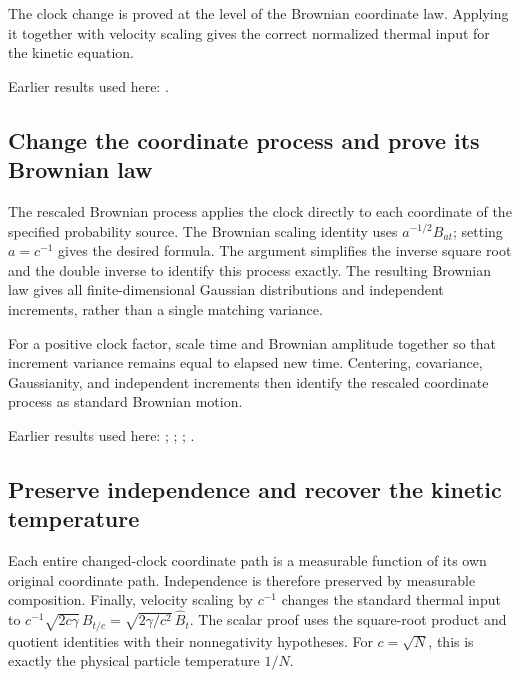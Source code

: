 \documentclass[11pt,a4paper]{report}
\begin{document}
The clock change is proved at the level of the Brownian coordinate law. Applying it together with velocity scaling gives the correct normalized thermal input for the kinetic equation.



Earlier results used here: \cite[Section~3.8]{LangevinLean2026ULASC}.
\subsection{\texorpdfstring{Change the coordinate process and prove its Brownian law}{Change the coordinate process and prove its Brownian law}}
\label{report-step-KineticLangevin-BrownianScaling-lean-1}


The rescaled Brownian process applies the clock directly to each coordinate of the specified probability source. The Brownian scaling identity uses \(a^{-1/2}B_{at}\); setting \(a=c^{-1}\) gives the desired formula. The argument simplifies the inverse square root and the double inverse to identify this process exactly. The resulting Brownian law gives all finite-dimensional Gaussian distributions and independent increments, rather than a single matching variance.



For a positive clock factor, scale time and Brownian amplitude together so that increment variance remains equal to elapsed new time. Centering, covariance, Gaussianity, and independent increments then identify the rescaled coordinate process as standard Brownian motion.



Earlier results used here: \cite[Section~3.8.16]{LangevinLean2026ULASC}; \cite[Section~3.8.17]{LangevinLean2026ULASC}; \cite[Section~3.8.18]{LangevinLean2026ULASC}; \cite[Section~3.8.19]{LangevinLean2026ULASC}.
\subsection{\texorpdfstring{Preserve independence and recover the kinetic temperature}{Preserve independence and recover the kinetic temperature}}
\label{report-step-KineticLangevin-BrownianScaling-lean-2}


Each entire changed-clock coordinate path is a measurable function of its own original coordinate path. Independence is therefore preserved by measurable composition. Finally, velocity scaling by \(c^{-1}\) changes the standard thermal input to \(c^{-1}\sqrt{2c\gamma}\,B_{t/c}=\sqrt{2\gamma/c^2}\,\widehat B_t\). The scalar proof uses the square-root product and quotient identities with their nonnegativity hypotheses. For \(c=\sqrt N\), this is exactly the physical particle temperature \(1/N\).
\end{document}
